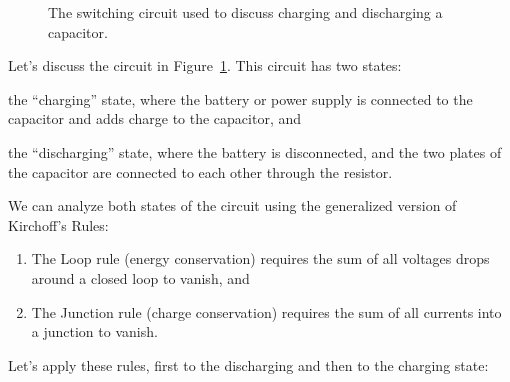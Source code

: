 \documentclass[12pt]{article}
\begin{document}
\begin{figure}
  \centering
  
  \caption{The switching circuit used to discuss charging and
    discharging a capacitor.} 
  \label{fig:circuit}
\end{figure}
Let's discuss the circuit in Figure~\ref{fig:circuit}.  This circuit
has two states:
\begin{inparaenum}
\item the ``charging'' state, where the battery or power supply is
  connected to the capacitor and adds charge to the capacitor, and
\item the ``discharging'' state, where the battery is disconnected,
  and the two plates of the capacitor are connected to each other
  through the resistor.
\end{inparaenum}
We can analyze both states of the circuit using the generalized version
of Kirchoff's Rules:
\begin{enumerate}
\item The Loop rule (energy conservation) requires the sum of all
  voltages drops around a closed loop to vanish, and
\item The Junction rule (charge conservation) requires the sum of all
  currents into a junction to vanish.
\end{enumerate}
Let's apply these rules, first to the discharging and then to the
charging state:
\end{document}
